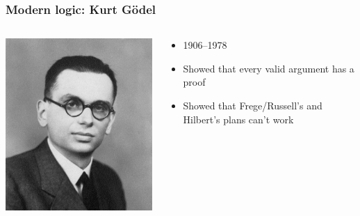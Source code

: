\begin{frame}
  \frametitle{Modern logic: Kurt G\"odel}

  \begin{columns}
    \begin{column}{.5\textwidth}
      \includegraphics[width=\textwidth]{../assets/goedel}
    \end{column}
    \begin{column}{.5\textwidth}
      \begin{itemize}
        \item 1906--1978
        \item Showed that every valid argument has a proof
        \item Showed that Frege/Russell's and Hilbert's plans can't work
      \end{itemize}
    \end{column}
  \end{columns}
\end{frame}

